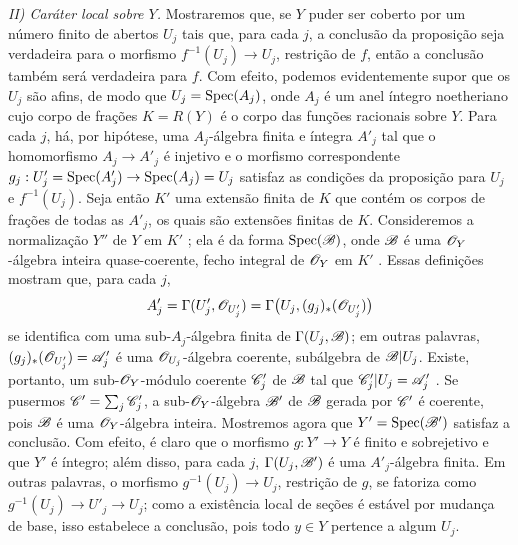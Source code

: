 \emph{II) Caráter local sobre $Y$.}
Mostraremos que, se $Y$ puder ser coberto por um número finito de abertos $U_j$ tais que, para cada $j$, a conclusão da proposição seja verdadeira para o morfismo $f^{-1}(U_j)\to U_j$, restrição de $f$, então a conclusão também será verdadeira para $f$.
Com efeito, podemos evidentemente supor que os $U_j$ são afins, de modo que $U_j=\operatorname{Spec}(A_j)$, onde $A_j$ é um anel íntegro noetheriano cujo corpo de frações $K=R(Y)$ é o corpo das funções racionais sobre $Y$.
Para cada $j$, há, por hipótese, uma $A_j$-álgebra finita e íntegra $A'_j$ tal que o homomorfismo $A_j\to A'_j$ é injetivo  e o morfismo correspondente $g_j:U'_j=\Spec(A'_j)\to\Spec(A_j)=U_j$ satisfaz as condições da proposição para $U_j$ e $f^{-1}(U_j)$.
Seja então $K'$ uma extensão finita de $K$ que contém os corpos de frações de todas as $A'_j$, os quais são extensões finitas de $K$.
Consideremos a normalização $Y''$ de $Y$ em $K'$ ; ela é da forma $\operatorname{Spec}(\mathscr{B})$, onde $\mathscr{B}$ é uma $\mathscr{O}_Y$-álgebra inteira quase-coerente, fecho integral de $\mathscr{O}_Y$ em $K'$ .
Essas definições mostram que, para cada $j$,
\[
  A'_j=\Gamma(U'_j,\mathscr{O}_{U'_j})
      =\Gamma\bigl(U_j,(g_j)_*(\mathscr{O}_{U'_j})\bigr)
\]
se identifica com uma sub-$A_j$-álgebra finita de $\Gamma(U_j,\mathscr{B})$; em outras palavras, $(g_j)_*(\mathscr{O}_{U'_j})=\mathscr{A}'_j$ é uma $\mathscr{O}_{U_j}$-álgebra coerente, subálgebra de $\mathscr{B}|U_j$.
Existe, portanto, um sub-$\mathscr{O}_Y$-módulo coerente $\mathscr{C}'_j$ de $\mathscr{B}$ tal que $\mathscr{C}'_j|U_j=\mathscr{A}'_j$ .
Se pusermos $\mathscr{C}'=\sum_j\mathscr{C}'_j$, a sub-$\mathscr{O}_Y$-álgebra $\mathscr{B}'$ de $\mathscr{B}$ gerada por $\mathscr{C}'$ é coerente, pois $\mathscr{B}$ é uma $\mathscr{O}_Y$-álgebra inteira.
Mostremos agora que $Y'=\operatorname{Spec}(\mathscr{B}')$ satisfaz a conclusão.
Com efeito, é claro que o morfismo $g:Y'\to Y$ é finito e sobrejetivo e que $Y'$ é íntegro; além disso, para cada $j$, $\Gamma(U_j,\mathscr{B}')$ é uma $A'_j$-álgebra finita.
Em outras palavras, o morfismo $g^{-1}(U_j)\to U_j$, restrição de $g$, se fatoriza como $g^{-1}(U_j)\to U'_j\to U_j$; como a existência local de seções é estável por mudança de base, isso estabelece a conclusão, pois todo $y\in Y$ pertence a algum $U_j$.

